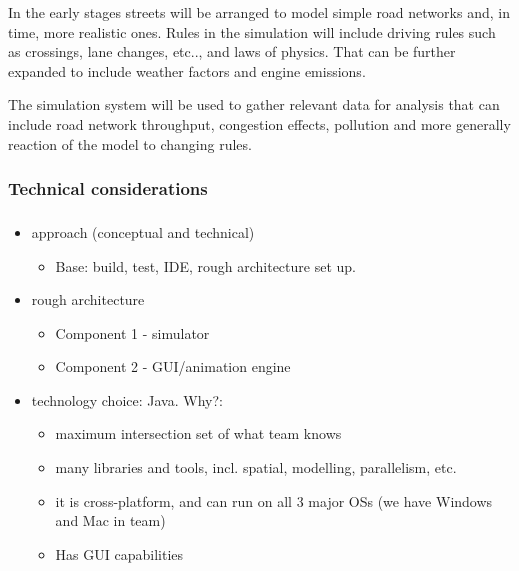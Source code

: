 In the early stages streets will be arranged to model simple road networks and, in time, more realistic ones.
Rules in the simulation will include driving rules such as crossings, lane changes, etc.., and laws of physics. That can be further expanded to include weather factors and engine emissions.

The simulation system will be used to gather relevant data for analysis that can include road network throughput, congestion effects, pollution and more generally reaction of the model to changing rules.

\subsubsection{Technical considerations} %


\subsubsection{}

	\begin{itemize}
		\item approach (conceptual and technical)
		\begin{itemize}
		    \item Base: build, test, IDE, rough architecture set up.
		    

		\end{itemize}

		\item rough architecture
		\begin{itemize}
		    \item Component 1 - simulator
		    \item Component 2 - GUI/animation engine
		\end{itemize}

		\item technology choice: Java. Why?:
		\begin{itemize}
		    \item maximum intersection set of what team knows
		    \item many libraries and tools, incl. spatial, modelling, parallelism, etc.
		    \item it is cross-platform, and can run on all 3 major OSs (we have Windows and Mac in team)
		    \item Has GUI capabilities
		\end{itemize}

	\end{itemize}
